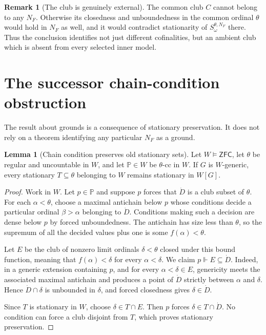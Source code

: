 \documentclass[11pt,letterpaper]{article}
\theoremstyle{definition}
\newtheorem{lemma}[definition]{Lemma}
\newtheorem{remark}[definition]{Remark}
\numberwithin{equation}{section}
\newcommand{\ZFC}{\mathsf{ZFC}}
\newcommand{\PP}{\mathbb P}
\begin{document}
\begin{remark}[The club is genuinely external]\label{rem:externalclub}
The common club $C$ cannot belong to any $N_F$. Otherwise its closedness and unboundedness in the common ordinal $\theta$ would hold in $N_F$ as well, and it would contradict stationarity of $S_\omega^{\theta,N_F}$ there. Thus the conclusion identifies not just different cofinalities, but an ambient club which is absent from every selected inner model.
\end{remark}

\section{The successor chain-condition obstruction}\label{sec:forcing}

The result about grounds is a consequence of stationary preservation. It does not rely on a theorem identifying any particular $N_F$ as a ground.

\begin{lemma}[Chain condition preserves old stationary sets]\label{lem:cc}
Let $W\models\ZFC$, let $\theta$ be regular and uncountable in $W$, and let $\PP\in W$ be $\theta$-cc in $W$. If $G$ is $W$-generic, every stationary $T\subseteq\theta$ belonging to $W$ remains stationary in $W[G]$.
\end{lemma}

\begin{proof}
Work in $W$. Let $p\in\PP$ and suppose $p$ forces that $\dot D$ is a club subset of $\theta$. For each $\alpha<\theta$, choose a maximal antichain below $p$ whose conditions decide a particular ordinal $\beta>\alpha$ belonging to $\dot D$. Conditions making such a decision are dense below $p$ by forced unboundedness. The antichain has size less than $\theta$, so the supremum of all the decided values plus one is some $f(\alpha)<\theta$.

Let $E$ be the club of nonzero limit ordinals $\delta<\theta$ closed under this bound function, meaning that $f(\alpha)<\delta$ for every $\alpha<\delta$. We claim $p\Vdash E\subseteq\dot D$. Indeed, in a generic extension containing $p$, and for every $\alpha<\delta\in E$, genericity meets the associated maximal antichain and produces a point of $\dot D$ strictly between $\alpha$ and $\delta$. Hence $\dot D\cap\delta$ is unbounded in $\delta$, and forced closedness gives $\delta\in\dot D$.

Since $T$ is stationary in $W$, choose $\delta\in T\cap E$. Then $p$ forces $\delta\in T\cap\dot D$. No condition can force a club disjoint from $T$, which proves stationary preservation.
\end{proof}
\end{document}
